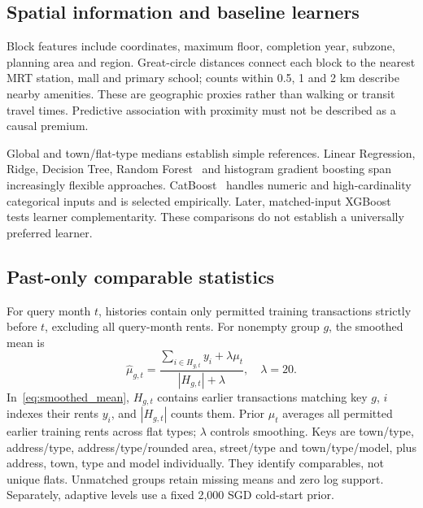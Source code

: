 \documentclass[conference]{IEEEtran}
\begin{document}
\subsection{Spatial information and baseline learners}
Block features include coordinates, maximum floor, completion year, subzone, planning area and region. Great-circle distances connect each block to the nearest MRT station, mall and primary school; counts within 0.5, 1 and 2 km describe nearby amenities. These are geographic proxies rather than walking or transit travel times. Predictive association with proximity must not be described as a causal premium.

Global and town/flat-type medians establish simple references. Linear Regression, Ridge, Decision Tree, Random Forest~\cite{Breiman_2001} and histogram gradient boosting span increasingly flexible approaches. CatBoost~\cite{NEURIPS2018_14491b75} handles numeric and high-cardinality categorical inputs and is selected empirically. Later, matched-input XGBoost~\cite{Chen_2016} tests learner complementarity. These comparisons do not establish a universally preferred learner.

\subsection{Past-only comparable statistics}
For query month $t$, histories contain only permitted training transactions strictly before $t$, excluding all query-month rents. For nonempty group $g$, the smoothed mean is
\begin{equation}
\widehat\mu_{g,t}=\frac{\sum_{i\in H_{g,t}}y_i+\lambda\mu_t}{|H_{g,t}|+\lambda},\quad\lambda=20.
\label{eq:smoothed_mean}
\end{equation}
In~\eqref{eq:smoothed_mean}, $H_{g,t}$ contains earlier transactions matching key $g$, $i$ indexes their rents $y_i$, and $|H_{g,t}|$ counts them. Prior $\mu_t$ averages all permitted earlier training rents across flat types; $\lambda$ controls smoothing. Keys are town/type, address/type, address/type/rounded area, street/type and town/type/model, plus address, town, type and model individually. They identify comparables, not unique flats. Unmatched groups retain missing means and zero log support. Separately, adaptive levels use a fixed 2,000 SGD cold-start prior.
\end{document}
